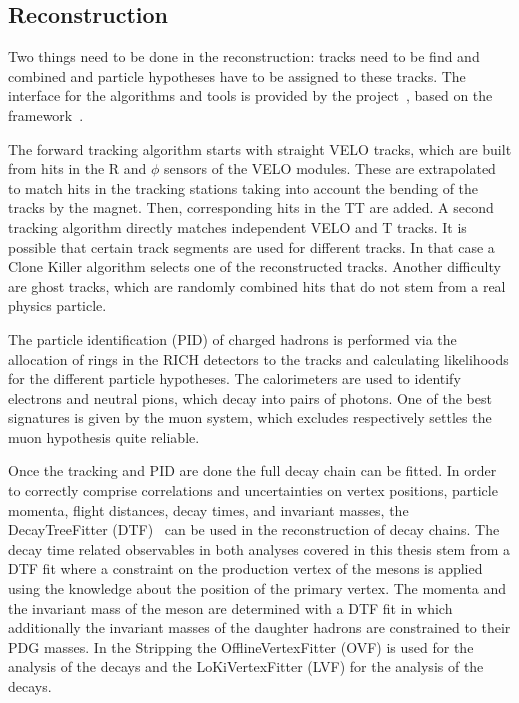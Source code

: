 
\subsection{Reconstruction}
\label{sec:detector:software:reconstruction}

Two things need to be done in the reconstruction: tracks need to be find and
combined and particle hypotheses have to be assigned to these tracks. The
interface for the algorithms and tools is provided by the \brunel
project~\cite{Brunel}, based on the \gaudi framework~\cite{Barrand:2001ny}.

The forward tracking algorithm starts with straight VELO tracks, which are
built from hits in the R and $\phi$ sensors of the VELO modules. These are
extrapolated to match hits in the tracking stations taking into account the
bending of the tracks by the magnet. Then, corresponding hits in the TT are
added. A second tracking algorithm directly matches independent VELO and T
tracks. It is possible that certain track segments are used for different
tracks. In that case a Clone Killer algorithm selects one of the reconstructed
tracks. Another difficulty are ghost tracks, which are randomly combined hits
that do not stem from a real physics particle.

The particle identification (PID) of charged hadrons is performed via the allocation
of rings in the RICH detectors to the tracks and calculating likelihoods for
the different particle hypotheses. The calorimeters are used to identify
electrons and neutral pions, which decay into pairs of photons. One of the
best signatures is given by the muon system, which excludes respectively
settles the muon hypothesis quite reliable.

Once the tracking and PID are done the full decay chain can be fitted. In
order to correctly comprise correlations and uncertainties on vertex
positions, particle momenta, flight distances, decay times, and invariant
masses, the \mbox{DecayTreeFitter} (DTF)~\cite{Hulsbergen:2005pu} can be used
in the reconstruction of decay chains. The decay time related observables in
both analyses covered in this thesis stem from a DTF fit where a constraint on
the production vertex of the \Bd mesons is applied using the knowledge about
the position of the primary vertex. The momenta and the invariant mass of the
\Bd meson are determined with a DTF fit in which additionally the invariant
masses of the daughter hadrons are constrained to their PDG masses. In the
Stripping the OfflineVertexFitter (OVF) is used for the analysis of the
\BdToJPsiKS decays and the LoKiVertexFitter (LVF) for the analysis of the
\BdToDD decays.